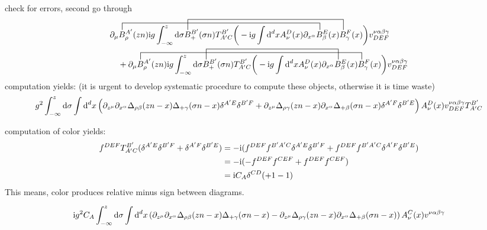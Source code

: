 {\huge{check for errors, second go through}}
\begin{align}
&\contraction[2ex]{\partial_\mu}{B}{^{A'}_\rho(zn) \imag g \int _{-\infty}^{z} \dx \sigma B_+^{B'}(\sigma n) T^{B'}_{A'C}\bigg(-\imag g \int \ddx xA_\nu^D(x) \partial_{x^\alpha}}{B}
\contraction[3ex]{\partial_\mu B^{A'}_\rho (zn) \imag g \int _{-\infty}^{z} \dx \sigma}{B}{_+^{B'}(\sigma n) T^{B'}_{A'C}\bigg(-\imag g \int \ddx xA_\nu^D(x) \partial_{x^\alpha} B_\beta^{E} (x) }{B}
\partial_\mu B^{A'}_\rho (zn) \imag g \int _{-\infty}^{z} \dx \sigma B_+^{B'}(\sigma n) T^{B'}_{A'C}\bigg(-\imag g \int \ddx xA_\nu^D(x) \partial_{x^\alpha} B_\beta^{E} (x) B_\gamma^F(x) \bigg) v^{\nu \alpha\beta\gamma}_{DEF}
\nl
+\contraction[2ex]{\partial_\mu}{B}{^{A'}_\rho (zn) \imag g \int _{-\infty}^{z} \dx \sigma B_+^{B'}(\sigma n) T^{B'}_{A'C}\bigg(-\imag g \int \ddx xA_\nu^D(x) \partial_{x^\alpha} B_\beta^{E} (x) }{B}
\contraction[3ex]{\partial_\mu B^{A'}_\rho (zn) \imag g \int _{-\infty}^{z} \dx \sigma}{B}{_+^{B'}(\sigma n) T^{B'}_{A'C}\bigg(-\imag g \int \ddx xA_\nu^D(x) \partial_{x^\alpha} }{B}
\partial_\mu B^{A'}_\rho (zn) \imag g \int _{-\infty}^{z} \dx \sigma B_+^{B'}(\sigma n) T^{B'}_{A'C}\bigg(-\imag g \int \ddx xA_\nu^D(x) \partial_{x^\alpha} B_\beta^{E} (x) B_\gamma^F(x) \bigg) v^{\nu \alpha\beta\gamma}_{DEF}
\end{align}
computation yields: (it is urgent to develop systematic procedure to compute these objects, otherwise it is time waste)
\begin{align}
g^2\int_{-\infty}^z \text{d} \sigma  \int \text{d} ^d x 
\left( \partial_{z^\mu} \partial_{x^\alpha} \Delta_{\rho \beta}(zn-x) \Delta_{+ \gamma}(\sigma n -x)\delta^{A'E} \delta^{B'F} + \partial_{z^\mu}  \Delta_{\rho \gamma}(zn-x) \partial_{x^\alpha}\Delta_{+ \beta}(\sigma n -x) \delta^{A'F} \delta^{B'E} \right)A_{\nu}^{D}(x)v^{\nu \alpha\beta\gamma}_{DEF} T^{B'}_{A'C}
\end{align}

computation of color yields:
\begin{align}
f^{DEF} T^{B'}_{A'C}(\delta^{A'E} \delta^{B'F} + \delta^{A'F} \delta^{B'E})
&=
-\text{i}(f^{DEF}f^{B'A'C}\delta^{A'E} \delta^{B'F} + f^{DEF}f^{B'A'C}\delta^{A'F} \delta^{B'E})
\\
&=
-\text{i}(-f^{DEF}f^{CEF} + f^{DEF}f^{CEF})
\\
&=
\text{i} C_A\delta^{CD}(+1 -1)
\end{align}
This means, color produces relative minus sign between diagrams.

\begin{align}
\text{i} g^2 C_A \int_{-\infty}^z \text{d} \sigma  \int \text{d} ^d x 
\left( \partial_{z^\mu} \partial_{x^\alpha} \Delta_{\rho \beta}(zn-x) \Delta_{+ \gamma}(\sigma n -x) - \partial_{z^\mu}  \Delta_{\rho \gamma}(zn-x) \partial_{x^\alpha}\Delta_{+ \beta}(\sigma n -x) \right)A_{\nu}^{C}(x)v^{\nu \alpha\beta\gamma}
\end{align}


